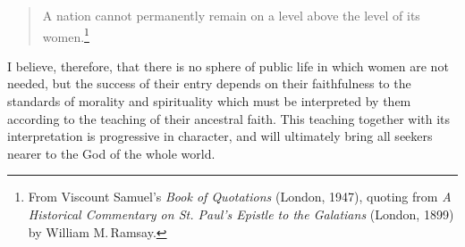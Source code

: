 \begin{quote}
A nation cannot permanently remain on a level
above the level of its women.\footnote{From Viscount Samuel's \textsl{Book of
  Quotations} (London, 1947), quoting from \textsl{A Historical Commentary on St. Paul's Epistle to the Galatians} (London, 1899) by William M.\,Ramsay.}
\end{quote}

I believe, therefore, that there is no sphere of
public life in which women are not needed, but the success
of their entry depends on their faithfulness to the
standards of morality and spirituality which must be interpreted
by them according to the teaching of their ancestral
faith. This teaching together with its interpretation is
progressive in character, and will ultimately bring all
seekers nearer to the God of the whole world.

